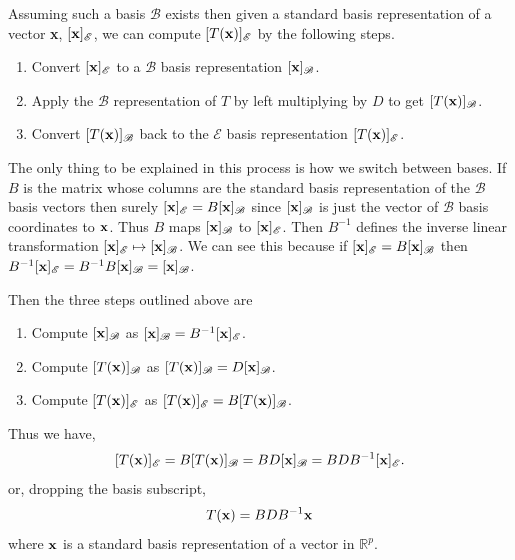 \documentclass{book}
\begin{document}
Assuming such a basis $\mathscr{B}$ exists then given a standard basis representation of a vector {\bf x}, $[{\bf x}]_\mathscr{E}$, we can compute $[T({\bf x})]_\mathscr{E}$ by the following steps. 
\begin{enumerate}
\item Convert $[{\bf x}]_\mathscr{E}$ to a $\mathscr{B}$ basis representation $[{\bf x}]_\mathscr{B}$.
\item Apply the $\mathscr{B}$ representation of $T$ by left multiplying by $D$ to get $[T({\bf x})]_\mathscr{B}$.
\item Convert $[T({\bf x})]_\mathscr{B}$ back to the $\mathscr{E}$ basis representation $[T({\bf x})]_\mathscr{E}$.
\end{enumerate}

The only thing to be explained in this process is how we switch between bases. If $B$ is the matrix whose columns are the standard basis representation of the $\mathscr{B}$ basis vectors then surely $[{\bf x}]_\mathscr{E}=B[{\bf x}]_\mathscr{B}$ since $[{\bf x}]_\mathscr{B}$ is just the vector of $\mathscr{B}$ basis coordinates to ${\bf x}$. Thus $B$ maps $[{\bf x}]_\mathscr{B}$ to $[{\bf x}]_\mathscr{E}$. Then $B^{-1}$ defines the inverse linear transformation $[{\bf x}]_\mathscr{E} \mapsto [{\bf x}]_\mathscr{B}$. We can see this because if $[{\bf x}]_\mathscr{E}=B[{\bf x}]_\mathscr{B}$ then $B^{-1}[{\bf x}]_\mathscr{E}=B^{-1}B[{\bf x}]_\mathscr{B}=[{\bf x}]_\mathscr{B}$.

\newpage Then the three steps outlined above are 
\begin{enumerate}
\item Compute $[{\bf x}]_\mathscr{B}$ as $[{\bf x}]_\mathscr{B}=B^{-1}[{\bf x}]_\mathscr{E}$.
\item Compute $[T({\bf x})]_\mathscr{B}$ as $[T({\bf x})]_\mathscr{B}=D[{\bf x}]_\mathscr{B}$.
\item Compute $[T({\bf x})]_\mathscr{E}$ as $[T({\bf x})]_\mathscr{E}=B[T({\bf x})]_\mathscr{B}$.
\end{enumerate}

Thus we have,
$$
[T({\bf x})]_\mathscr{E}=B[T({\bf x})]_\mathscr{B}=BD[{\bf x}]_\mathscr{B}=BDB^{-1}[{\bf x}]_\mathscr{E}.
$$
or, dropping the basis subscript, 
$$
T({\bf x})=BDB^{-1}{\bf x}
$$
where ${\bf x}$ is a standard basis representation of a vector in $\mathbb{R}^p$. 
\end{document}
